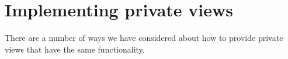 % 
% 


\section{Implementing private views}
There are a number of ways we have considered about how to provide private views that have the same functionality.

